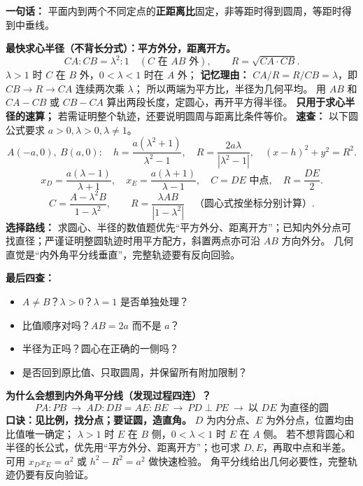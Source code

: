 \clearpage
\begin{summarybox}
\textbf{一句话：} 平面内到两个不同定点的\textbf{正距离比}固定，非等距时得到圆周，等距时得到中垂线。

\textbf{最快求心半径（不背长分式）：平方外分，距离开方。}
\[
 \boxed{CA:CB=\lambda^2:1\quad(C\text{ 在 }AB\text{ 外})},\qquad
 \boxed{R=\sqrt{CA\cdot CB}}.
\]
$\lambda>1$ 时 $C$ 在 $B$ 外，$0<\lambda<1$ 时在 $A$ 外；
\textbf{记忆理由：} $CA/R=R/CB=\lambda$，即 $CB\to R\to CA$ 连续两次乘 $\lambda$；
所以两端为平方比，半径为几何平均。
用 $AB$ 和 $CA-CB$ 或 $CB-CA$ 算出两段长度，定圆心，再开平方得半径。
\textbf{只用于求心半径的速算；} 若需证明整个轨迹，还要说明圆周与距离比条件等价。
\textbf{速查：} 以下圆公式要求 $a>0,\lambda>0,\lambda\ne1$。
\[
 A(-a,0),\ B(a,0):\quad
 h=\frac{a(\lambda^2+1)}{\lambda^2-1},\quad
 R=\frac{2a\lambda}{|\lambda^2-1|},\quad
 (x-h)^2+y^2=R^2.
\]
\[
 x_D=\frac{a(\lambda-1)}{\lambda+1},\quad
 x_E=\frac{a(\lambda+1)}{\lambda-1},\quad
 C=\text{$DE$ 中点},\quad R=\frac{DE}{2}.
\]
\[
 C=\frac{A-\lambda^2B}{1-\lambda^2},\qquad
 R=\frac{\lambda AB}{|1-\lambda^2|}
 \quad\text{（圆心式按坐标分别计算）}.
\]
\textbf{选择路线：} 求圆心、半径的数值题优先“平方外分、距离开方”；已知内外分点可找直径；严谨证明整圆轨迹时用平方配方，斜置两点亦可沿 $AB$ 方向外分。
几何直觉是“内外角平分线垂直”，完整轨迹要有反向回验。

\textbf{最后四查：}
\begin{itemize}[leftmargin=*]
\item $A\ne B$？$\lambda>0$？$\lambda=1$ 是否单独处理？
\item 比值顺序对吗？$AB=2a$ 而不是 $a$？
\item 半径为正吗？圆心在正确的一侧吗？
\item 是否回到原比值、只取圆周，并保留所有附加限制？
\end{itemize}


\textbf{为什么会想到内外角平分线（发现过程四连）？}
\[
 \boxed{PA:PB\ \longrightarrow\ AD:DB=AE:BE\
 \longrightarrow\ PD\perp PE\ \longrightarrow\
 \text{以 $DE$ 为直径的圆}}
\]
\textbf{口诀：见比例，找分点；要证圆，造直角。}
$D$ 为内分点、$E$ 为外分点，位置均由比值唯一确定；
$\lambda>1$ 时 $E$ 在 $B$ 侧，$0<\lambda<1$ 时 $E$ 在 $A$ 侧。
若不想背圆心和半径的长公式，优先用“平方外分、距离开方”；也可求 $D,E$，再取中点和半差。可用
$\boxed{x_Dx_E=a^2}$ 或 $h^2-R^2=a^2$ 做快速检验。
角平分线给出几何必要性，完整轨迹仍要有反向验证。
\end{summarybox}
